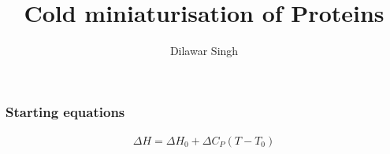 \documentclass[]{beamer}
\title{Cold miniaturisation of Proteins}
\author{Dilawar Singh}
\begin{document}
\begin{frame}
    \frametitle{Starting equations}

    \begin{eqnarray}
        \Delta H = \Delta H_0 + \Delta C_P (T-T_0) \\
    \end{eqnarray}

\end{frame}


    
\end{document}
